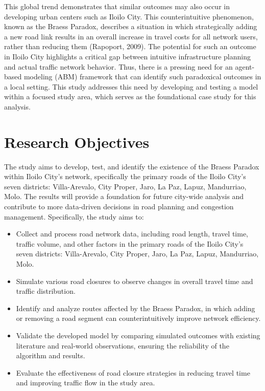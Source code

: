 This global trend demonstrates that similar outcomes may also occur in developing urban centers such as Iloilo City. This counterintuitive phenomenon, known as the Braess Paradox, describes a situation in which strategically adding a new road link results in an overall increase in travel costs for all network users, rather than reducing them (Rapoport, 2009). The potential for such an outcome in Iloilo City highlights a critical gap between intuitive infrastructure planning and actual traffic network behavior. Thus, there is a pressing need for an agent-based modeling (ABM) framework that can identify such paradoxical outcomes in a local setting. This study addresses this need by developing and testing a model within a focused study area, which serves as the foundational case study for this analysis.

\section{Research Objectives}
\label{sec:research_objectives}

The study aims to develop, test, and identify the existence of the Braess Paradox within Iloilo City's network, specifically the primary roads of the Iloilo City's seven districts: Villa-Arevalo, City Proper, Jaro, La Paz, Lapuz, Mandurriao, Molo. The results will provide a foundation for future city-wide analysis and contribute to more data-driven decisions in road planning and congestion management. Specifically, the study aims to:

\begin{itemize}
    \item Collect and process road network data, including road length, travel time, traffic volume, and other factors in the primary roads of the Iloilo City's seven districts: Villa-Arevalo, City Proper, Jaro, La Paz, Lapuz, Mandurriao, Molo.
    \item Simulate various road closures to observe changes in overall travel time and traffic distribution.
    \item Identify and analyze routes affected by the Braess Paradox, in which adding or removing a road segment can counterintuitively improve network efficiency.
    \item Validate the developed model by comparing simulated outcomes with existing literature and real-world observations, ensuring the reliability of the algorithm and results.
    \item Evaluate the effectiveness of road closure strategies in reducing travel time and improving traffic flow in the study area.
\end{itemize}

